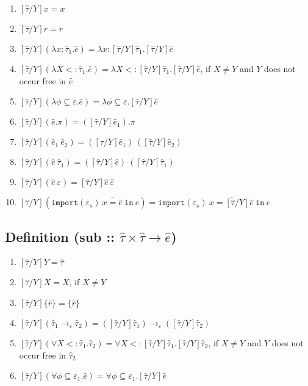 \documentclass{llncs}
\newcommand{\keywadj}[1]{\mathtt{#1}}
\newcommand{\keyw}[1]{\keywadj{#1}~}
\newcommand{\kw}[1]{\keyw{ #1 }}
\newcommand{\kwa}[1]{\keywadj{ #1 }}
\begin{document}
\begin{enumerate}
	\item $[\hat \tau/Y]x = x$
	\item $[\hat \tau/Y]r = r$
	\item $[\hat \tau/Y](\lambda x: \hat \tau_1. \hat e) = \lambda x: [\hat \tau/Y]\hat \tau_1. [\hat \tau/Y]\hat e$
	\item $[\hat \tau/Y](\lambda X <: \hat \tau_1. \hat e) = \lambda X <: [\hat \tau/Y]\hat \tau_1. [\hat \tau/Y]\hat e$, if $X \neq Y$ and $Y$ does not occur free in $\hat e$
	\item $[\hat \tau/Y](\lambda \phi \subseteq \varepsilon. \hat e) = \lambda \phi \subseteq \varepsilon. [\hat \tau/Y]\hat e$
	\item $[\hat \tau/Y](\hat e.\pi) = ([\hat \tau/Y]\hat e_1).\pi$
	\item $[\hat \tau/Y](\hat e_1~\hat e_2) = ([\hat \tau/Y]\hat e_1)~([\hat \tau/Y]\hat e_2)$
	\item $[\hat \tau/Y](\hat e~\hat \tau_1) = ([\hat \tau/Y]\hat e)~([\hat \tau/Y]\hat \tau_1)$
	\item $[\hat \tau/Y](\hat e~\varepsilon) = [\hat \tau/Y]\hat e~\hat \varepsilon$
	\item $[\hat \tau/Y](\kwa{import}(\varepsilon_s)~\overline{x = \hat e}~\kw{in} e) = \kwa{import}(\varepsilon_s)~\overline{x = [\hat \tau/Y]\hat e}~\kw{in} e$
\end{enumerate}

\subsection*{Definition (sub :: $\hat \tau \times \hat \tau \rightarrow \hat e$)}

\begin{enumerate}
	\item $[\hat \tau/Y]Y = \hat \tau$
	\item $[\hat \tau/Y]X = X$, if $X \neq Y$
	\item $[\hat \tau/Y]\{ \bar r \} = \{ \bar r \}$
	\item $[\hat \tau/Y](\hat \tau_1 \rightarrow_{\varepsilon} \hat \tau_2) = ([\hat \tau/Y]\hat \tau_1) \rightarrow_{\varepsilon} ([\hat \tau/Y]\hat \tau_2)$
	\item $[\hat \tau/Y](\forall X <: \hat \tau_1. \hat \tau_2) = \forall X <: [\hat \tau/Y]\hat \tau_1.  [\hat \tau/Y]\hat \tau_2$, if $X \neq Y$ and $Y$ does not occur free in $ \hat \tau_2$
	\item $[\hat \tau/Y](\forall \phi \subseteq \varepsilon_1. \hat e) = \forall \phi \subseteq \varepsilon_1. [\hat \tau/Y]\hat e$
\end{enumerate}
\end{document}

